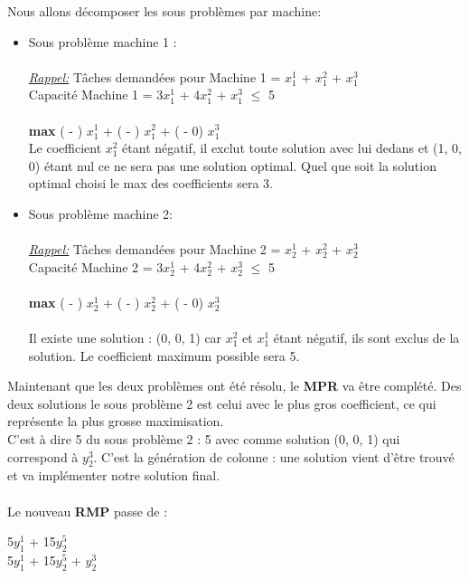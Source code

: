 Nous allons décomposer les sous problèmes par machine:
\begin{itemize}
\item{
Sous problème machine 1 : \\ \\ 
\textit{\underline{Rappel:}}  Tâches demandées pour Machine 1 =  $x_1^1$ + $x_1^2$ + $x_1^3$  \\ 
Capacité Machine 1 = 3$x_1^1$ + 4$x_1^2$ + $x_1^3$ $\leq$ 5
\\ \\ 
\textbf{max} (  -  ) $x_1^1$ + ( -  ) $x_1^2$ + ( - 0) $x_1^3$
\\
 Le coefficient $x_1^2$ étant négatif, il exclut toute solution avec lui dedans et (1, 0, 0) étant nul ce ne sera pas une solution optimal. Quel que soit la solution optimal choisi le max des coefficients sera 3. 
}

\item{
Sous problème machine 2: 
\\
\\
\textit{\underline{Rappel:}}  Tâches demandées pour Machine 2 =  $x_2^1$ + $x_2^2$ + $x_2^3$  \\ 
Capacité Machine 2 = 3$x_2^1$ + 4$x_2^2$ + $x_2^3$ $\leq$ 5
\\ \\ 
\textbf{max} (  -  ) $x_2^1$ + ( -  ) $x_2^2$ + ( - 0) $x_2^3$
\\
\\ Il existe une solution : (0, 0, 1) car $x_1^2$  et $x_1^1$  étant négatif, ils sont exclus de la solution. Le coefficient maximum possible sera 5.
}
\end{itemize}

Maintenant que les deux problèmes ont été résolu, le \textbf{MPR} va être complété. Des deux solutions le sous problème 2 est celui avec le plus gros coefficient, ce qui représente la plus grosse maximisation.
\\
C'est à dire 5 du sous problème 2 : 5 avec comme solution (0, 0, 1) qui correspond à $y_2^3$. C'est la génération de colonne : une solution vient d'être trouvé et va implémenter notre solution final.
\\ \\ 
Le nouveau \textbf{RMP} passe de :
\begin{center}
 5$y_1^1$  + 15$y_2^5$  \\
 5$y_1^1$  + 15$y_2^5$ +   $y_2^3$
\end{center}

